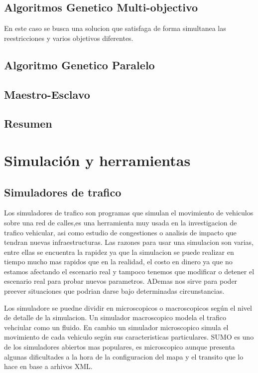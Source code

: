 \subsection{Algoritmos Genetico Multi-objectivo}
En este caso se busca una solucion que satisfaga de forma simultanea las reestricciones y varios objetivos diferentes.

\subsection{Algoritmo Genetico Paralelo}
\subsection{Maestro-Esclavo}
\subsection{Resumen}




\section{Simulación y herramientas}
\subsection{Simuladores de trafico}
Los simuladores de trafico son programas que simulan el movimiento de vehiculos sobre una red de calles,es una herramienta muy usada en la investigacion de trafico vehicular, asi como estudio de congestiones o analisis de impacto que tendran nuevas infraestructuras.  Las razones para usar una simulacion son varias, entre ellas se encuentra  la rapidez  ya que la simulacion se puede realizar en tiempo mucho mas rapidos que en la realidad, el costo en dinero ya que no estamos afectando el escenario real  y tampoco tenemos que modificar o detener el escenario real para probar nuevos parametros. ADemas nos sirve para poder preever situaciones que podrian darse bajo determinadas circunstancias.

Los simuladore se puedne dividir en microscopicos o macroscopicos según el nivel de detalle de la simulacion. Un simulador macroscopico modela  el trafico vehciular como un fluido. En cambio un simulador microscopico simula el movimiento de cada vehiculo según sus caracteristicas particulares.
SUMO es uno de los simuladores abiertos mas populares,  es microscopico aunque presenta algunas dificultades a la hora de la configuracion del mapa y el transito que lo hace en base a arhivos XML.

